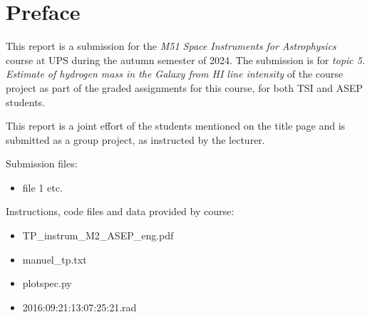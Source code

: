 \section*{Preface}


This report is a submission for the \textit{M51 Space Instruments for Astrophysics} course at \ac{UPS} during the autumn semester of 2024.
The submission is for \textit{topic 5. Estimate of hydrogen mass in the Galaxy from HI line intensity} of the course project as part of the graded assignments for this course, for both \ac{TSI} and \ac{ASEP} students. 

This report is a joint effort of the students mentioned on the title page and is submitted as a group project, as instructed by the lecturer.



Submission files:
\begin{itemize}
    \item file 1 etc.
\end{itemize}

Instructions, code files and data provided by course:
\begin{itemize}
    \item TP\_instrum\_M2\_ASEP\_eng.pdf
    \item manuel\_tp.txt
    \item plotspec.py
    \item 2016:09:21:13:07:25:21.rad
\end{itemize}


\vspace{2cm}






